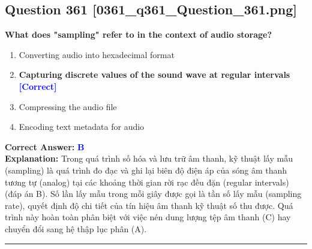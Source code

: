 \documentclass[11pt,a4paper]{article}
\begin{document}
\begin{minipage}{\textwidth}
\subsection*{Question 361 \quad \footnotesize{[0361\_q361\_Question\_361.png]}}
\noindent \textbf{What does "sampling" refer to in the context of audio storage?}

\begin{enumerate}[label=\Alph*.]
    \item Converting audio into hexadecimal format
    \item \textbf{Capturing discrete values of the sound wave at regular intervals} \hfill \textcolor{blue}{\textbf{[Correct]}}
    \item Compressing the audio file
    \item Encoding text metadata for audio
\end{enumerate}

\noindent \textbf{Correct Answer:} \textcolor{blue}{\textbf{B}} \\[2pt]
\noindent \textbf{Explanation:} Trong quá trình số hóa và lưu trữ âm thanh, kỹ thuật lấy mẫu (sampling) là quá trình đo đạc và ghi lại biên độ điện áp của sóng âm thanh tương tự (analog) tại các khoảng thời gian rời rạc đều đặn (regular intervals) (đáp án B). Số lần lấy mẫu trong mỗi giây được gọi là tần số lấy mẫu (sampling rate), quyết định độ chi tiết của tín hiệu âm thanh kỹ thuật số thu được. Quá trình này hoàn toàn phân biệt với việc nén dung lượng tệp âm thanh (C) hay chuyển đổi sang hệ thập lục phân (A).

\par\vspace{0.3cm}
\hrule
\vspace{0.3cm}
\end{minipage}
\end{document}
